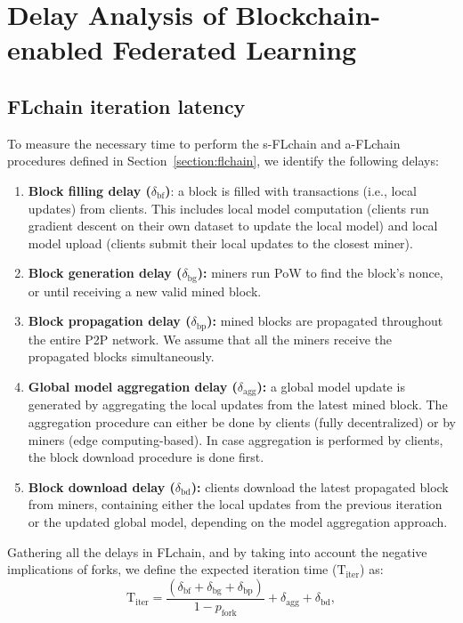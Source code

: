 \documentclass[lettersize,journal]{IEEEtran}
\begin{document}
\section{Delay Analysis of Blockchain-enabled Federated Learning}
\label{section:delay_bc}

\subsection{FLchain iteration latency}

To measure the necessary time to perform the s-FLchain and a-FLchain procedures defined in Section~\ref{section:flchain}, we identify the following delays:
\begin{enumerate}
	\item \textbf{Block filling delay ($\delta_\text{bf}$)}: a block is filled with transactions (i.e., local updates) from clients. This includes local model computation (clients run gradient descent on their own dataset to update the local model) and local model upload (clients submit their local updates to the closest miner).
	\item \textbf{Block generation delay ($\delta_\text{bg}$):} miners run PoW to find the block's nonce, or until receiving a new valid mined block.
	\item \textbf{Block propagation delay ($\delta_\text{bp}$):} mined blocks are propagated throughout the entire P2P network. We assume that all the miners receive the propagated blocks simultaneously.
	\item \textbf{Global model aggregation delay ($\delta_\text{agg}$):} a global model update is generated by aggregating the local updates from the latest mined block. The aggregation procedure can either be done by clients (fully decentralized) or by miners (edge computing-based). In case aggregation is performed by clients, the block download procedure is done first.
	\item \textbf{Block download delay ($\delta_\text{bd}$):} clients download the latest propagated block from miners, containing either the local updates from the previous iteration or the updated global model, depending on the model aggregation approach.
\end{enumerate}

Gathering all the delays in FLchain, and by taking into account the negative implications of forks, we define the expected iteration time ($\text{T}_\text{iter}$) as:
\begin{equation}
\text{T}_\text{iter} =  \frac{(\delta_\text{bf} + \delta_\text{bg} + \delta_\text{bp})}{1-p_\text{fork}} + \delta_\text{agg} + \delta_\text{bd},
\label{eq:delay}
\end{equation}
\end{document}
